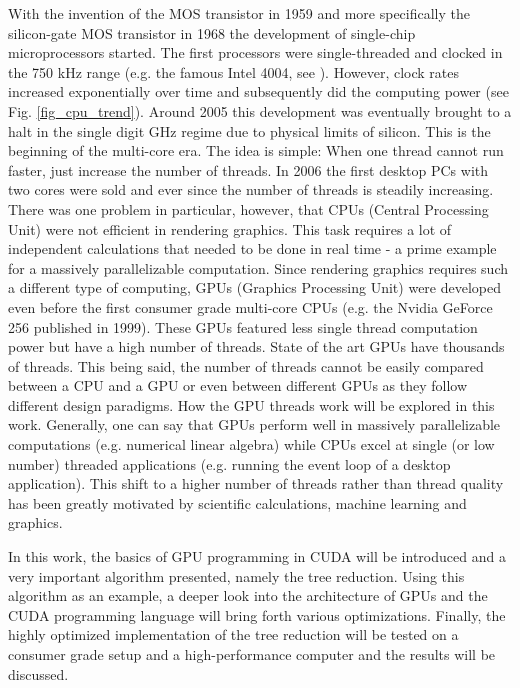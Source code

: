 With the invention of the MOS transistor in 1959 and more specifically the silicon-gate MOS transistor in 1968 the development of single-chip microprocessors started.
The first processors were single-threaded and clocked in the 750 kHz range (e.g. the famous Intel 4004, see \cite{Intel4004}).
However, clock rates increased exponentially over time and subsequently did the computing power (see Fig. \ref{fig_cpu_trend}).
Around 2005 this development was eventually brought to a halt in the single digit GHz regime due to physical limits of silicon. 
This is the beginning of the multi-core era. 
The idea is simple: When one thread cannot run faster, just increase the number of threads.
In 2006 the first desktop PCs with two cores were sold and ever since the number of threads is steadily increasing.
There was one problem in particular, however, that CPUs (Central Processing Unit) were not efficient in rendering graphics.
This task requires a lot of independent calculations that needed to be done in real time - a prime example for a massively parallelizable computation.
Since rendering graphics requires such a different type of computing, GPUs (Graphics Processing Unit) were developed even before the first consumer grade multi-core CPUs (e.g. the Nvidia GeForce 256 published in 1999).
These GPUs featured less single thread computation power but have a high number of threads.
State of the art GPUs have thousands of threads.
This being said, the number of threads cannot be easily compared between a CPU and a GPU or even between different GPUs as they follow different design paradigms.
How the GPU threads work will be explored in this work.
Generally, one can say that GPUs perform well in massively parallelizable computations (e.g. numerical linear algebra) while CPUs excel at single (or low number) threaded applications (e.g. running the event loop of a desktop application).
This shift to a higher number of threads rather than thread quality has been greatly motivated by scientific calculations, machine learning and graphics.

In this work, the basics of GPU programming in CUDA will be introduced and a very important algorithm presented, namely the tree reduction.
Using this algorithm as an example, a deeper look into the architecture of GPUs and the CUDA programming language will bring forth various optimizations.
Finally, the highly optimized implementation of the tree reduction will be tested on a consumer grade setup and a high-performance computer and the results will be discussed.

